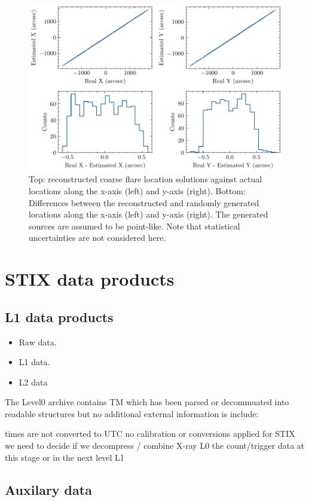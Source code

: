 \documentclass[referee]{aa} %
\begin{document}
\begin{figure}
  \centering
  \includegraphics[width=0.7\linewidth]{figures/cflError.pdf}
  \caption{Top: reconstructed coarse flare location solutions against actual locations along the x-axis (left) and y-axis (right). Bottom:
  Differences between the reconstructed and randomly generated locations along
   the x-axis (left) and y-axis (right). The generated sources are assumed to be point-like. Note that statistical
   uncertainties are not considered here. 
    }
  \label{fig:cflerror}
\end{figure}
\section{STIX data products}
\subsection{L1 data products}
\begin{itemize}
    \item Raw data.
    \item L1 data.
    \item L2 data
    
\end{itemize}



The Level0 archive contains TM which has been parsed or decommuated into readable structures but no additional external information is include:

times are not converted to UTC
no calibration or conversions applied
for STIX we need to decide if we decompress / combine X-ray L0 the count/trigger data at this stage or in the next level L1


\subsection{Auxilary data}
\end{document}
